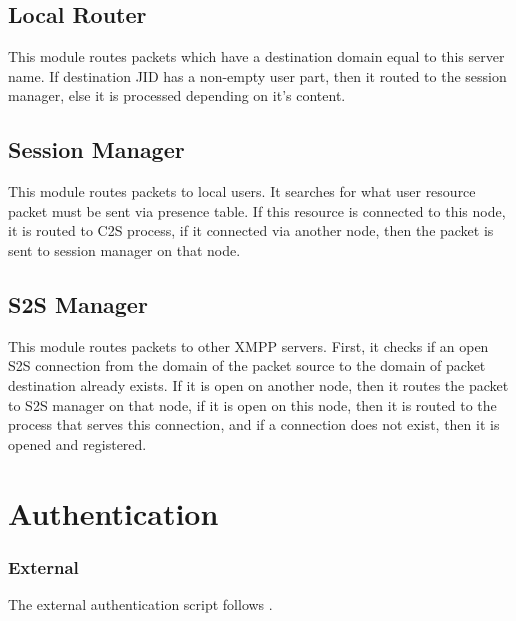 \documentclass[a4paper,10pt]{article}
\newcommand{\ind}[1]{\begin{latexonly}\index{#1}\end{latexonly}}
\newcommand{\XMPP}{XMPP}
\begin{document}
\subsection{Local Router}

This module routes packets which have a destination domain equal to this server
name.  If destination JID has a non-empty user part, then it routed to the
session manager, else it is processed depending on it's content.


\subsection{Session Manager}

This module routes packets to local users.  It searches for what user resource
packet must be sent via presence table.  If this resource is connected to
this node, it is routed to C2S process, if it connected via another node, then
the packet is sent to session manager on that node.


\subsection{S2S Manager}

This module routes packets to other \XMPP{} servers.  First, it checks if an
open S2S connection from the domain of the packet source to the domain of
packet destination already exists. If it is open on another node, then it
routes the packet to S2S manager on that node, if it is open on this node, then
it is routed to the process that serves this connection, and if a connection
does not exist, then it is opened and registered.


\section{Authentication}

\subsubsection{External}
\label{externalauth}
\ind{external authentication}

The external authentication script follows
.
\end{document}
